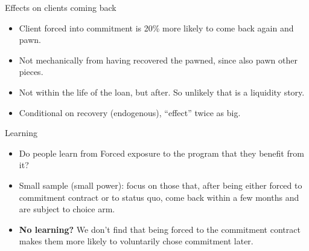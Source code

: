 \documentclass[8pt]{beamer}
\begin{document}


\begin{frame}{Effects on clients coming back}

\begin{itemize}
    \item Client forced into commitment is 20\% more likely to come back again and pawn.
    \item Not mechanically from having recovered the pawned, since also pawn other pieces.
    \item Not within the life of the loan, but after. So unlikely that is a liquidity story.
    \item Conditional on recovery (endogenous), ``effect'' twice as big.
\end{itemize}

\vspace{.2in}
\begin{table}[H]
\begin{center}
\footnotesize{}
\end{center}
\end{table}    
\end{frame}



\begin{frame}{Learning}
    \label{learning_table}
    \begin{itemize}
    \item  Do people learn from Forced exposure to the program that they benefit from it?  
    \vspace{.1in}
    \item  Small sample (small power): focus on those that, after being either forced to commitment contract or to status quo, come back within a few months and are subject to choice arm.
    \vspace{.1in}
    \item  \textbf{No learning?} We don't find that being forced to the commitment contract makes them more likely to voluntarily chose commitment later.
 \end{itemize}  
 \vspace{.2in}
\begin{table}[H]
\begin{center}
\small{}
\end{center}
\end{table}
\end{frame}
\end{document}
